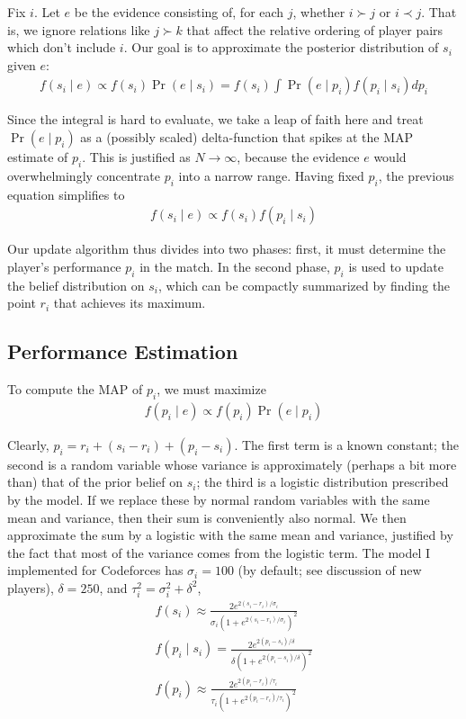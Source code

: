 \documentclass{article}
\begin{document}
Fix $i$. Let $e$ be the evidence consisting of, for each $j$, whether $i \succ j$ or $i \prec j$. That is, we ignore relations like $j \succ k$ that affect the relative ordering of player pairs which don't include $i$. Our goal is to approximate the posterior distribution of $s_i$ given $e$:
\begin{align}
f(s_i\mid e) \propto f(s_i)\Pr(e\mid s_i) = f(s_i)\int \Pr(e\mid p_i)f(p_i\mid s_i)dp_i
\end{align}

Since the integral is hard to evaluate, we take a leap of faith here and treat $\Pr(e\mid p_i)$ as a (possibly scaled) delta-function that spikes at the MAP estimate of $p_i$. This is justified as $N \rightarrow \infty$, because the evidence $e$ would overwhelmingly concentrate $p_i$ into a narrow range. Having fixed $p_i$, the previous equation simplifies to
\begin{align}
f(s_i\mid e) \propto f(s_i)f(p_i\mid s_i)
\end{align}

Our update algorithm thus divides into two phases: first, it must determine the player's performance $p_i$ in the match. In the second phase, $p_i$ is used to update the belief distribution on $s_i$, which can be compactly summarized by finding the point $r_i$ that achieves its maximum.

\subsection{Performance Estimation}

To compute the MAP of $p_i$, we must maximize
\begin{align}
f(p_i\mid e) \propto f(p_i) \Pr(e\mid p_i)
\end{align}

Clearly, $p_i = r_i + (s_i-r_i) + (p_i-s_i)$. The first term is a known constant; the second is a random variable whose variance is approximately (perhaps a bit more than) that of the prior belief on $s_i$; the third is a logistic distribution prescribed by the model. If we replace these by normal random variables with the same mean and variance, then their sum is conveniently also normal. We then approximate the sum by a logistic with the same mean and variance, justified by the fact that most of the variance comes from the logistic term. The model I implemented for Codeforces has $\sigma_i = 100$ (by default; see discussion of new players), $\delta = 250$, and $\tau_i^2 = \sigma_i^2 + \delta^2$,
\begin{align}
f(s_i) \approx \frac { 2e^{2(s_i-r_i)/\sigma_i} } { \sigma_i\left(1 + e^{2(s_i-r_i)/\sigma_i} \right)^2 }
\\f(p_i\mid s_i) = \frac { 2e^{2(p_i-s_i)/\delta} } { \delta\left(1 + e^{2(p_i-s_i)/\delta} \right)^2}
\\f(p_i) \approx \frac { 2e^{2(p_i-r_i)/\tau_i} } { \tau_i\left(1 + e^{2(p_i-r_i)/\tau_i} \right)^2}
\end{align}
\end{document}
